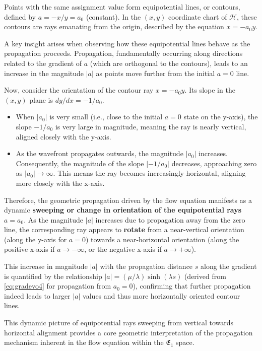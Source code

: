 Points with the same assignment value form equipotential lines, or contours, defined by $a = -x/y = a_0$ (constant). In the $(x,y)$ coordinate chart of $\mathcal{H}$, these contours are rays emanating from the origin, described by the equation $x = -a_0 y$.

A key insight arises when observing how these equipotential lines behave as the propagation proceeds. Propagation, fundamentally occurring along directions related to the gradient of $a$ (which are orthogonal to the contours), leads to an increase in the magnitude $|a|$ as points move further from the initial $a=0$ line.

Now, consider the orientation of the contour ray $x = -a_0 y$. Its slope in the $(x,y)$ plane is $dy/dx = -1/a_0$.
\begin{itemize}
    \item When $|a_0|$ is very small (i.e., close to the initial $a=0$ state on the y-axis), the slope $-1/a_0$ is very large in magnitude, meaning the ray is nearly vertical, aligned closely with the y-axis.
    \item As the wavefront propagates outwards, the magnitude $|a_0|$ increases. Consequently, the magnitude of the slope $|-1/a_0|$ decreases, approaching zero as $|a_0| \to \infty$. This means the ray becomes increasingly horizontal, aligning more closely with the x-axis.
\end{itemize}
Therefore, the geometric propagation driven by the flow equation manifests as a dynamic \textbf{sweeping or change in orientation of the equipotential rays} $a=a_0$. As the magnitude $|a|$ increases due to propagation away from the zero line, the corresponding ray appears to \textbf{rotate} from a near-vertical orientation (along the y-axis for $a=0$) towards a near-horizontal orientation (along the positive x-axis if $a \to -\infty$, or the negative x-axis if $a \to +\infty$).

This increase in magnitude $|a|$ with the propagation distance $s$ along the gradient is quantified by the relationship $|a| = (\mu/\lambda) \sinh(\lambda s)$ (derived from \eqref{eq:gradevo4} for propagation from $a_0=0$), confirming that further propagation indeed leads to larger $|a|$ values and thus more horizontally oriented contour lines.

This dynamic picture of equipotential rays sweeping from vertical towards horizontal alignment provides a core geometric interpretation of the propagation mechanism inherent in the flow equation within the $\mathfrak{E}_1$ space.


